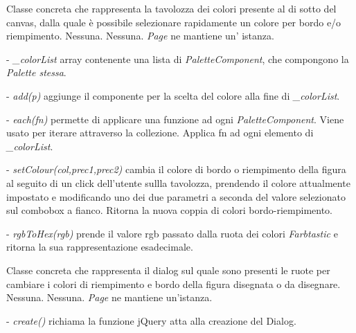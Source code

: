 Classe concreta che rappresenta la tavolozza dei colori presente al di sotto del canvas, dalla quale \` e possibile selezionare rapidamente un colore per bordo e/o riempimento.
Nessuna.
Nessuna.
\textit{Page} ne mantiene un' istanza.
\begin{elencopuntato}[\subsubsecindent]
\item[-] \textit{{\_}colorList} array contenente una lista di \textit{PaletteComponent}, che compongono la \textit{Palette stessa}.
\end{elencopuntato}
\begin{elencopuntato}[\subsubsecindent]
\item[-] \textit{add(p)} aggiunge il componente per la scelta del colore alla fine di \textit{{\_}colorList}.
\item[-]  \textit{each(fn)} permette di applicare una funzione ad ogni \textit{PaletteComponent}. Viene usato per iterare attraverso la collezione. Applica fn ad ogni elemento di \textit{{\_}colorList}. 
\item[-]  \textit{setColour(col,prec1,prec2)} cambia il colore di bordo o riempimento della figura al seguito di un click dell'utente sullla tavolozza, prendendo il colore attualmente impostato e modificando uno dei due parametri a seconda del valore selezionato sul combobox a fianco. Ritorna la nuova coppia di colori bordo-riempimento.
\item[-]  \textit{rgbToHex(rgb)} prende il valore rgb passato dalla ruota dei colori \textit{Farbtastic} e ritorna la sua rappresentazione esadecimale.
\end{elencopuntato}

Classe concreta che rappresenta il dialog sul quale sono presenti le ruote per cambiare i colori di riempimento e bordo della figura disegnata o da disegnare.
Nessuna.
Nessuna.
\textit{Page} ne mantiene un'istanza.

\begin{elencopuntato}[\subsubsecindent]
\item[-] \textit{create()} richiama la funzione jQuery atta alla creazione del Dialog.
\end{elencopuntato}

